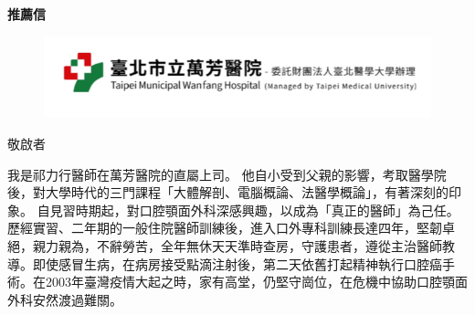 \documentclass{letter}
\date{}
\begin{document}
\begin{letter}
{
\centering \Large \textbf{推薦信}
}

\hfill
\begin{figure}%
    \includegraphics[width=0.3\textheight]{TMWH.png}
\end{figure}

\opening{敬啟者} %
\medskip 



\indent 我是祁力行醫師在萬芳醫院的直屬上司。
他自小受到父親的影響，考取醫學院後，對大學時代的三門課程「大體解剖、電腦概論、法醫學概論」，有著深刻的印象。
自見習時期起，對口腔顎面外科深感興趣，以成為「真正的醫師」為己任。歷經實習、二年期的一般住院醫師訓練後，進入口外專科訓練長達四年，堅韌卓絕，親力親為，不辭勞苦，全年無休天天準時查房，守護患者，遵從主治醫師教導。即使感冒生病，在病房接受點滴注射後，第二天依舊打起精神執行口腔癌手術。在2003年臺灣疫情大起之時，家有高堂，仍堅守崗位，在危機中協助口腔顎面外科安然渡過難關。




\end{letter}
\end{document}
